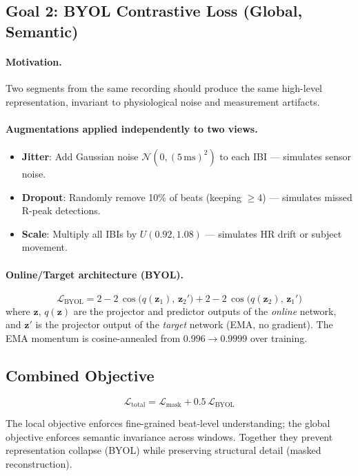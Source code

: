 \documentclass[11pt,a4paper]{article}
\begin{document}
\subsection{Goal 2: BYOL Contrastive Loss (Global, Semantic)}

\paragraph{Motivation.}
Two segments from the same recording should produce the same high-level representation,
invariant to physiological noise and measurement artifacts.

\paragraph{Augmentations applied independently to two views.}
\begin{itemize}[leftmargin=*]
    \item \textbf{Jitter}: Add Gaussian noise $\mathcal{N}(0, (5\,\text{ms})^2)$ to each IBI --- simulates sensor noise.
    \item \textbf{Dropout}: Randomly remove 10\% of beats (keeping $\geq 4$) --- simulates missed R-peak detections.
    \item \textbf{Scale}: Multiply all IBIs by $U(0.92, 1.08)$ --- simulates HR drift or subject movement.
\end{itemize}

\paragraph{Online/Target architecture (BYOL).}
\[
    \mathcal{L}_{\text{BYOL}} = 2 - 2\,\cos\!\bigl(q(\mathbf{z}_1),\,\mathbf{z}_2'\bigr)
    + 2 - 2\,\cos\!\bigl(q(\mathbf{z}_2),\,\mathbf{z}_1'\bigr)
\]
where $\mathbf{z}$, $q(\mathbf{z})$ are the projector and predictor outputs of the \emph{online} network,
and $\mathbf{z}'$ is the projector output of the \emph{target} network (EMA, no gradient).
The EMA momentum is cosine-annealed from $0.996 \to 0.9999$ over training.

\subsection{Combined Objective}

\[
    \boxed{\mathcal{L}_{\text{total}} = \mathcal{L}_{\text{mask}} + 0.5\,\mathcal{L}_{\text{BYOL}}}
\]

The local objective enforces fine-grained beat-level understanding;
the global objective enforces semantic invariance across windows.
Together they prevent representation collapse (BYOL) while preserving structural detail (masked reconstruction).
\end{document}
